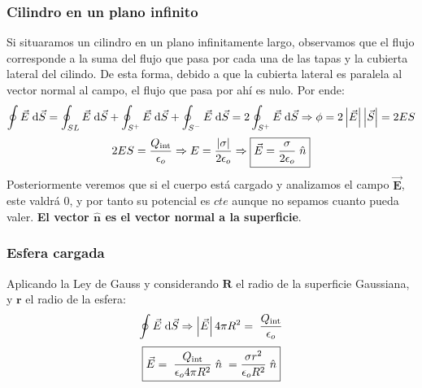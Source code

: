 \subsubsection{Cilindro en un plano infinito}
\noindent Si situaramos un cilindro en un plano infinitamente largo, observamos que el flujo corresponde a la suma del flujo que pasa por cada una de las tapas y la cubierta lateral del cilindo. De esta forma, debido a que la cubierta lateral es paralela al vector normal al campo, el flujo que pasa por ahí es nulo. Por ende:
\[
        \oint \vec{E}\hspace{1mm}\mathrm{d} \vec{S} = \oint_{SL}\vec{E}\hspace{1mm}\mathrm{d} \vec{S} +\oint_{S^+}\vec{E}\hspace{1mm}\mathrm{d} \vec{S}+\oint_{S^-}\vec{E}\hspace{1mm}\mathrm{d} \vec{S} =
        2 \oint_{S^+} \vec{E}\hspace{1mm}\mathrm{d} \vec{S} \Rightarrow \phi =2\left | \vec{E} \right |\left | \vec{S} \right | = 2ES
\]
\[
        2ES = \frac{Q_{\textnormal{int}}}{\epsilon_o} \Rightarrow E = \frac{\left | \sigma \right |}{2\epsilon_o} \Rightarrow \boxed{\vec{E} = \frac{\sigma}{2\epsilon_o}\hspace{1mm}\hat{n}}
\]
Posteriormente veremos que si el cuerpo está cargado y analizamos el campo \(\bm{\vec{E}}\), este valdrá 0, y por tanto su potencial es \(cte\) aunque no sepamos cuanto pueda valer. \textbf{El vector \(\bm{\hat{n}}\) es el vector normal a la superficie}.
\subsubsection{Esfera cargada}
\noindent Aplicando la Ley de Gauss y considerando \(\bm{R}\) el radio de la superficie Gaussiana, y \(\bm{r}\) el radio de la esfera:
\[
        \oint \vec{E} \hspace{1mm} \mathrm{d}\vec{S} \Rightarrow \left | \vec{E} \right | 4\pi R^2 = \hspace{1mm} \frac{Q_{\textnormal{int}}}{\epsilon_o}
\]
\[
        \boxed{\vec{E}  = \hspace{1mm} \frac{Q_{\textnormal{int}}}{\epsilon_o4\pi R^2} \hspace{1mm}\hat{n} \hspace{1mm} = \frac{\sigma r^2}{\epsilon_o R^2} \hspace{1mm}\hat{n}}
\]

